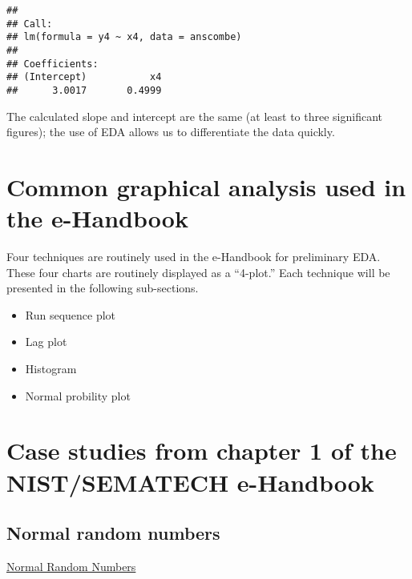 \documentclass[]{book}
\newenvironment{Shaded}{\begin{snugshade}}{\end{snugshade}}
\newcommand{\DataTypeTok}[1]{\textcolor[rgb]{0.13,0.29,0.53}{#1}}
\newcommand{\DecValTok}[1]{\textcolor[rgb]{0.00,0.00,0.81}{#1}}
\newcommand{\KeywordTok}[1]{\textcolor[rgb]{0.13,0.29,0.53}{\textbf{#1}}}
\newcommand{\NormalTok}[1]{#1}
\newcommand{\OperatorTok}[1]{\textcolor[rgb]{0.81,0.36,0.00}{\textbf{#1}}}
\newcommand{\StringTok}[1]{\textcolor[rgb]{0.31,0.60,0.02}{#1}}
\providecommand{\tightlist}{%
  \setlength{\itemsep}{0pt}\setlength{\parskip}{0pt}}
\theoremstyle{definition}
\theoremstyle{definition}
\theoremstyle{definition}
\theoremstyle{remark}
\begin{document}
\begin{verbatim}
## 
## Call:
## lm(formula = y4 ~ x4, data = anscombe)
## 
## Coefficients:
## (Intercept)           x4  
##      3.0017       0.4999
\end{verbatim}

The calculated slope and intercept are the same (at least to three
significant figures); the use of EDA allows us to differentiate the data
quickly.

\hypertarget{common-graphical-analysis-used-in-the-e-handbook}{%
\section{Common graphical analysis used in the
e-Handbook}\label{common-graphical-analysis-used-in-the-e-handbook}}

Four techniques are routinely used in the e-Handbook for preliminary
EDA. These four charts are routinely displayed as a ``4-plot.'' Each
technique will be presented in the following sub-sections.

\begin{itemize}
\tightlist
\item
  Run sequence plot
\item
  Lag plot
\item
  Histogram
\item
  Normal probility plot
\end{itemize}

\hypertarget{case-studies-from-chapter-1-of-the-nistsematech-e-handbook}{%
\section{Case studies from chapter 1 of the NIST/SEMATECH
e-Handbook}\label{case-studies-from-chapter-1-of-the-nistsematech-e-handbook}}

\hypertarget{normal-random-numbers}{%
\subsection{Normal random numbers}\label{normal-random-numbers}}

\href{https://www.itl.nist.gov/div898/handbook/eda/section4/eda421.htm}{Normal
Random Numbers}

\begin{Shaded}
\end{Shaded}
\end{document}
